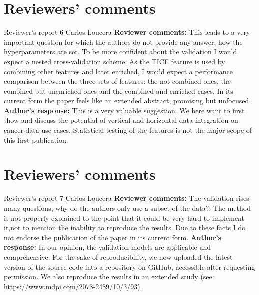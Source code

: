 \documentclass{bmcart}
\begin{document}
\begin{backmatter}
\section*{Reviewers' comments}
\newline Reviewer's report 6
\newline Carlos Loucera
\newline \textbf{Reviewer comments:}
This leads to a very important question for which the authors do not provide any answer: how the hyperparameters are set. To be more confident about the validation I would expect a nested cross-validation scheme. As the TICF feature is used by combining other features and later enriched, I would expect a performance comparison between the three sets of features: the not-combined ones, the combined but unenriched ones and the combined and enriched cases. In its current form the paper feels like an extended abstract, promising but unfocused.
\newline \textbf{Author's response:}
This is a very valuable suggestion. We here want to first show and discuss the potential of vertical and horizontal data integration on cancer data use cases. Statistical testing of the features is not the major scope of this first publication.

\section*{Reviewers' comments}
\newline Reviewer's report 7
\newline Carlos Loucera
\newline \textbf{Reviewer comments:}
The validation rises many questions, why do the authors only use a subset of the data?. The method is not properly explained to the point that it could be very hard to implement it,not to mention the inability to reproduce the results.  Due to these facts I do not endorse the publication of the paper in its current form.
\newline \textbf{Author's response:}
In our opinion, the validation models are applicable and comprehensive. For the sake of reproducibility, we now uploaded the latest version of the source code into a repository on GitHub, accessible after requesting permission. We also reproduce the results in an extended study (see: https://www.mdpi.com/2078-2489/10/3/93).



\end{backmatter}
\end{document}

